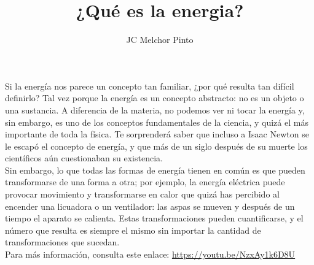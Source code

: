 \documentclass[12pt,addpoints,answers]{guia}
\title{¿Qué es la energia?}
\author{JC Melchor Pinto}
\begin{document}
\pagestyle{headandfoot}

\INFO
\begin{opening}
    {Si la energía nos parece un concepto tan familiar, ¿por qué resulta tan
        difícil definirlo? Tal vez porque la energía es un concepto abstracto: no
        es un objeto o una sustancia. A diferencia de la materia, no podemos
        ver ni tocar la energía y, sin embargo, es uno de los conceptos fundamentales
        de la ciencia, y quizá el más importante de toda la física. Te sorprenderá saber que incluso a Isaac Newton se le escapó
        el concepto de energía, y que más de un siglo después de su muerte los
        científicos aún cuestionaban su existencia.\\[1em]
        Sin embargo, lo que todas las formas de energía tienen en común es
        que pueden transformarse de una forma a otra; por ejemplo, la energía
        eléctrica puede provocar movimiento y transformarse en calor que quizá
        has percibido al encender una licuadora o un ventilador: las aspas se mueven y después de un tiempo el aparato se calienta. Estas transformaciones
        pueden cuantificarse, y el número que resulta es siempre el mismo sin importar la cantidad de transformaciones que sucedan.
        \\[1em]
        Para más información, consulta este enlace: \href{https://youtu.be/NzxAy1k6D8U}{https://youtu.be/NzxAy1k6D8U}
    }
\end{opening}
\begin{questions}
    
    \newpage
    
\end{questions}

\end{document}
